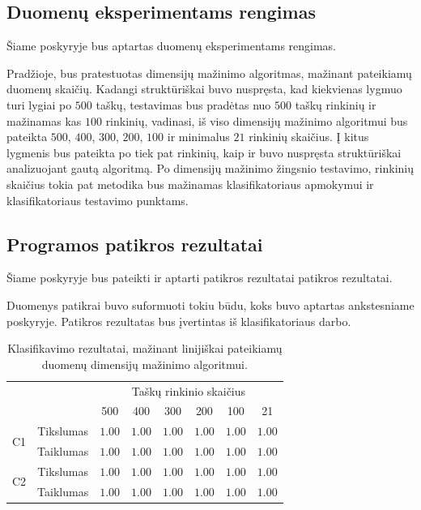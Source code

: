 \documentclass[]{vgtuef}
\begin{document}

\subsection{Duomenų eksperimentams rengimas}

Šiame poskyryje bus aptartas duomenų eksperimentams rengimas. 

Pradžioje, bus pratestuotas dimensijų mažinimo algoritmas, mažinant pateikiamų duomenų skaičių. Kadangi struktūriškai buvo nuspręsta, kad kiekvienas lygmuo turi lygiai po $500$ taškų, testavimas bus pradėtas nuo $500$ taškų rinkinių ir mažinamas kas $100$ rinkinių, vadinasi, iš viso dimensijų mažinimo algoritmui bus pateikta $500$, $400$, $300$, $200$, $100$ ir minimalus $21$ rinkinių skaičius. Į kitus lygmenis bus pateikta po tiek pat rinkinių, kaip ir buvo nuspręsta struktūriškai analizuojant gautą algoritmą. Po dimensijų mažinimo žingsnio testavimo, rinkinių skaičius tokia pat metodika bus mažinamas klasifikatoriaus apmokymui ir klasifikatoriaus testavimo punktams. 


\subsection{Programos patikros rezultatai}

Šiame poskyryje bus pateikti ir aptarti patikros rezultatai patikros rezultatai.

Duomenys patikrai buvo suformuoti tokiu būdu, koks buvo aptartas ankstesniame poskyryje. Patikros rezultatas bus įvertintas iš klasifikatoriaus darbo. 

\begin{table}
	\centering
	\caption{Klasifikavimo rezultatai, mažinant linijiškai pateikiamų duomenų dimensijų mažinimo algoritmui.}
	\label{table:first_phase_experiment}
	\begin{tabular}{|c|c|c|c|c|c|c|c|} \hline
			& & \multicolumn{6}{c|}{Taškų rinkinio skaičius} \\ \cline{3-8}
						&	& 500 	& 400	& 300 	& 200 & 100 	& 21 	\\ \hline
		\multirow{2}{*}{C1}
		& Tikslumas	& $1.00$ & $1.00$	& $1.00$ & $1.00$ & $1.00$ & $1.00$ \\ \cline{2-8}
		& Taiklumas  &	$1.00$ & $1.00$	& $1.00$ & $1.00$ & $1.00$ & $1.00$ \\ \hline
		\multirow{2}{*}{C2}
		& Tikslumas	& $1.00$ & $1.00$	& $1.00$ & $1.00$ & $1.00$ & $1.00$ \\ \cline{2-8}
		& Taiklumas  &	$1.00$ & $1.00$	& $1.00$ & $1.00$ & $1.00$ & $1.00$ \\ \hline
	\end{tabular}
\end{table}
\end{document}
